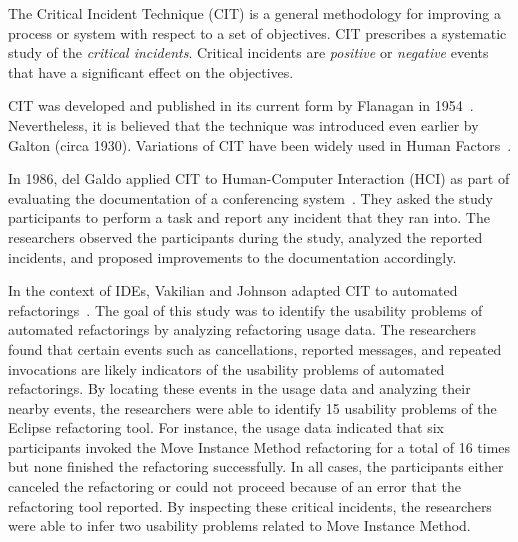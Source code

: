 The Critical Incident Technique (CIT) is a general methodology for improving a
process or system with respect to a set of objectives. CIT prescribes a
systematic study of the \emph{critical incidents}. Critical incidents are
\emph{positive} or \emph{negative} events that have a significant effect on the
objectives.

CIT was developed and published in its current form by Flanagan in
1954~\cite{Flanagan1954CIT}. Nevertheless, it is believed that the technique was
introduced even earlier by Galton (circa 1930). Variations of CIT have been
widely used in Human Factors~\cite{ShattuckWoods1994CIT}.

In 1986, del Galdo \etal applied CIT to Human-Computer Interaction (HCI) as part
of evaluating the documentation of a conferencing system~\cite{DelGaldo1986CIT}.
They asked the study participants to perform a task and report any incident that
they ran into. The researchers observed the participants during the study,
analyzed the reported incidents, and proposed improvements to the documentation
accordingly.

In the context of IDEs, Vakilian and Johnson adapted CIT to automated
refactorings~\cite{VakilianJohnson2014Alternate}. The goal of this study was to
identify the usability problems of automated refactorings by analyzing
refactoring usage data. The researchers found that certain events such as
cancellations, reported messages, and repeated invocations are likely indicators
of the usability problems of automated refactorings. By locating these events in
the usage data and analyzing their nearby events, the researchers were able to
identify 15 usability problems of the Eclipse refactoring tool. For instance,
the usage data indicated that six participants invoked the Move Instance Method
refactoring for a total of 16 times but none finished the refactoring
successfully. In all cases, the participants either canceled the refactoring or
could not proceed because of an error that the refactoring tool reported. By
inspecting these critical incidents, the researchers were able to infer two
usability problems related to Move Instance Method.

